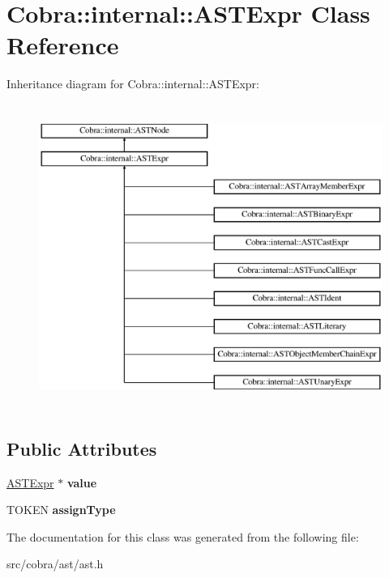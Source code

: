\hypertarget{class_cobra_1_1internal_1_1_a_s_t_expr}{\section{Cobra\+:\+:internal\+:\+:A\+S\+T\+Expr Class Reference}
\label{class_cobra_1_1internal_1_1_a_s_t_expr}
}
Inheritance diagram for Cobra\+:\+:internal\+:\+:A\+S\+T\+Expr\+:\begin{figure}[H]
\begin{center}
\leavevmode
\includegraphics[height=10.000000cm]{class_cobra_1_1internal_1_1_a_s_t_expr}
\end{center}
\end{figure}
\subsection*{Public Attributes}
\begin{DoxyCompactItemize}
\item 
\hypertarget{class_cobra_1_1internal_1_1_a_s_t_expr_af1bf2806f323bc63de0a3aab9f181923}{\hyperlink{class_cobra_1_1internal_1_1_a_s_t_expr}{A\+S\+T\+Expr} $\ast$ {\bfseries value}}\label{class_cobra_1_1internal_1_1_a_s_t_expr_af1bf2806f323bc63de0a3aab9f181923}

\item 
\hypertarget{class_cobra_1_1internal_1_1_a_s_t_expr_a88bfbf832e3b00a89ba949562f573919}{T\+O\+K\+E\+N {\bfseries assign\+Type}}\label{class_cobra_1_1internal_1_1_a_s_t_expr_a88bfbf832e3b00a89ba949562f573919}

\end{DoxyCompactItemize}


The documentation for this class was generated from the following file\+:\begin{DoxyCompactItemize}
\item 
src/cobra/ast/ast.\+h\end{DoxyCompactItemize}
